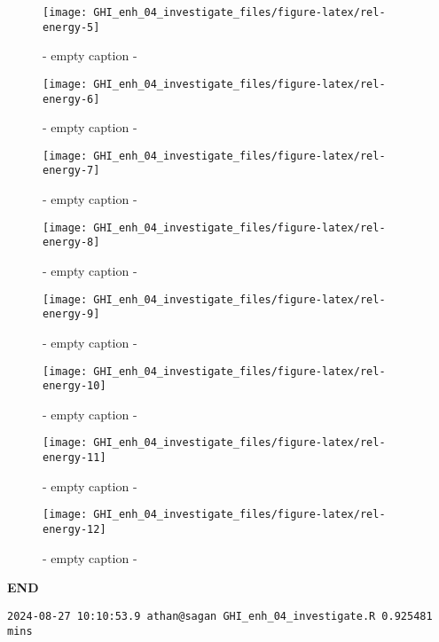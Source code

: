 \documentclass[
  10pt,
  a4paper,oneside]{article}
\begin{document}
\begin{figure}[H]

{\centering \texttt{[image: GHI\_enh\_04\_investigate\_files/figure-latex/rel-energy-5]} 

}

\caption{ - empty caption - }\label{fig:rel-energy-5}
\end{figure}
\begin{figure}[H]

{\centering \texttt{[image: GHI\_enh\_04\_investigate\_files/figure-latex/rel-energy-6]} 

}

\caption{ - empty caption - }\label{fig:rel-energy-6}
\end{figure}
\begin{figure}[H]

{\centering \texttt{[image: GHI\_enh\_04\_investigate\_files/figure-latex/rel-energy-7]} 

}

\caption{ - empty caption - }\label{fig:rel-energy-7}
\end{figure}
\begin{figure}[H]

{\centering \texttt{[image: GHI\_enh\_04\_investigate\_files/figure-latex/rel-energy-8]} 

}

\caption{ - empty caption - }\label{fig:rel-energy-8}
\end{figure}
\begin{figure}[H]

{\centering \texttt{[image: GHI\_enh\_04\_investigate\_files/figure-latex/rel-energy-9]} 

}

\caption{ - empty caption - }\label{fig:rel-energy-9}
\end{figure}
\begin{figure}[H]

{\centering \texttt{[image: GHI\_enh\_04\_investigate\_files/figure-latex/rel-energy-10]} 

}

\caption{ - empty caption - }\label{fig:rel-energy-10}
\end{figure}
\begin{figure}[H]

{\centering \texttt{[image: GHI\_enh\_04\_investigate\_files/figure-latex/rel-energy-11]} 

}

\caption{ - empty caption - }\label{fig:rel-energy-11}
\end{figure}
\begin{figure}[H]

{\centering \texttt{[image: GHI\_enh\_04\_investigate\_files/figure-latex/rel-energy-12]} 

}

\caption{ - empty caption - }\label{fig:rel-energy-12}
\end{figure}

\textbf{END}

\begin{verbatim}
2024-08-27 10:10:53.9 athan@sagan GHI_enh_04_investigate.R 0.925481 mins
\end{verbatim}
\end{document}
